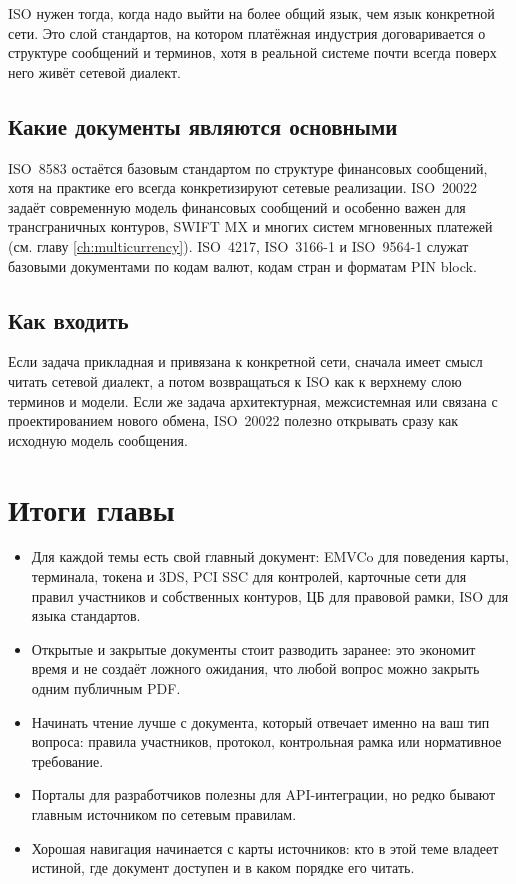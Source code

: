 ISO нужен тогда, когда надо выйти на более общий язык, чем язык
конкретной сети. Это слой стандартов, на котором платёжная
индустрия договаривается о структуре сообщений и терминов, хотя
в реальной системе почти всегда поверх него живёт сетевой
диалект.

\subsection*{Какие документы являются основными}

ISO~8583 остаётся базовым стандартом по структуре финансовых
сообщений, хотя на практике его всегда конкретизируют сетевые
реализации. ISO~20022 задаёт современную модель финансовых
сообщений и особенно важен для трансграничных контуров, SWIFT MX
и многих систем мгновенных платежей
(см. главу \ref{ch:multicurrency}). ISO~4217, ISO~3166-1
и ISO~9564-1 служат базовыми документами по кодам валют,
кодам стран и форматам PIN block.





\subsection*{Как входить}

Если задача прикладная и привязана к конкретной сети, сначала
имеет смысл читать сетевой диалект, а потом возвращаться к ISO
как к верхнему слою терминов и модели. Если же задача
архитектурная, межсистемная или связана с проектированием
нового обмена, ISO~20022 полезно открывать сразу
как исходную модель сообщения.

\section*{Итоги главы}
\begin{itemize}
  \item Для каждой темы есть свой главный документ: EMVCo для
    поведения карты, терминала, токена и 3DS, PCI SSC
    для контролей, карточные сети для правил участников
    и собственных контуров, ЦБ для правовой рамки, ISO
    для языка стандартов.
  \item Открытые и закрытые документы стоит разводить заранее:
    это экономит время и не создаёт ложного ожидания,
    что любой вопрос можно закрыть одним публичным PDF.
  \item Начинать чтение лучше с документа, который отвечает
    именно на ваш тип вопроса: правила участников, протокол,
    контрольная рамка или нормативное требование.
  \item Порталы для разработчиков полезны для API-интеграции,
    но редко бывают главным источником по сетевым правилам.
  \item Хорошая навигация начинается с карты источников:
    кто в этой теме владеет истиной, где документ доступен
    и в каком порядке его читать.
\end{itemize}
